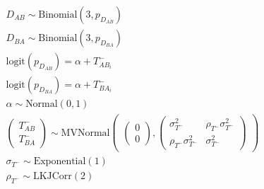 \documentclass[
]{article}
\begin{document}
\[
\begin{aligned}
    D_{AB} \sim \text{Binomial}(3, p_{D_{AB}})\\
    D_{BA} \sim \text{Binomial}(3, p_{D_{BA}})\\
    \text{logit}(p_{D_{AB}}) = \alpha + T^-_{AB_i}\\
    \text{logit}(p_{D_{BA}}) = \alpha + T^-_{BA_i}\\
    \alpha \sim \text{Normal}(0,1)\\
    \begin{pmatrix}T^-_{AB}\\T^-_{BA}\end{pmatrix} \sim \text{MVNormal}\begin{pmatrix}\begin{pmatrix}0\\0\end{pmatrix}, \begin{pmatrix}\sigma_{T^-}^2 & \rho_{T^-}\sigma_{T^-}^2\\\rho_{T^-}\sigma_{T^-}^2 &\sigma_{T^-}^2\end{pmatrix}\end{pmatrix}\\
    \sigma_{T^-} \sim \text{Exponential}(1)\\
    \rho_{T^-} \sim \text{LKJCorr}(2)
\end{aligned}
\]
\end{document}
